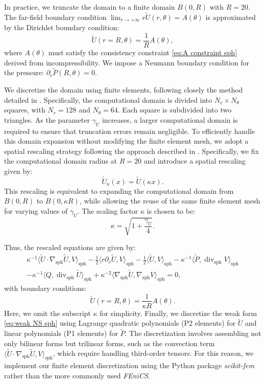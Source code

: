 \documentclass[11pt,a4paper]{article}
\numberwithin{equation}{section}
\newcommand{\cdummy}{\cdot}
\newcommand{\nospace}{}
\newcommand{\tmem}[1]{{\em #1\/}}
\newcommand{\tmop}[1]{\ensuremath{\operatorname{#1}}}
\begin{document}
In practice, we truncate the
domain to a finite domain $B
(0, R)$ with $R = 20$. The far-field boundary condition $\lim \nospace_{r
\to + \infty} r \widetilde{U} (r, \theta) = A (\theta)$ is approximated by
the Dirichlet boundary condition:
\[ \widetilde{U} (r = R, \theta) = \frac{1}{R} A (\theta), \]
where $A (\theta)$ must satisfy the consistency constraint \eqref{eq:A
constraint sph} derived from incompressibility. We impose a Neumann boundary condition for the pressure: $\partial_r\widetilde{P} (R, \theta) = 0$.

We discretize the domain using finite elements, following closely the method
detailed in {\cite{guillod2023numerical}}. Specifically, the computational
domain is divided into $N_r \times N_{\theta}$ squares, with $N_r = 128$ and
$N_{\theta} = 64$. Each square is subdivided into two triangles. As the
parameter $\gamma_U$ increases, a larger computational domain is required to
ensure that truncation errors remain negligible. To efficiently handle this
domain expansion without modifying the finite element mesh, we adopt a spatial
rescaling strategy following the approach described in
{\cite{guillod2023numerical}}. Specifically, we fix the computational domain
radius at $R = 20$ and introduce a spatial rescaling given by:
\[ \widetilde{U}_{\kappa} (x) = \widetilde{U} (\kappa x). \]
This rescaling is equivalent to expanding the computational domain from $B (0,
R)$ to $B (0, \kappa R)$, while allowing the reuse of the same finite element mesh
for varying values of $\gamma_U$. The scaling factor $\kappa$ is chosen to be:
\[ \kappa = \sqrt{1 + \frac{\gamma_U}{4}} . \]


Thus, the rescaled equations are given by:
\begin{equation}
  \begin{array}{l}
    \kappa^{-1} \langle \widetilde{U} \cdummy \nabla_{\tmop{sph}} \widetilde{U}, V
    \rangle_{\tmop{sph}} - \frac{1}{2} \langle r \partial_r \widetilde{U}, V
    \rangle_{\tmop{sph}} - \frac{1}{2} \langle \widetilde{U}, V
    \rangle_{\tmop{sph}} - \kappa^{-1} \langle \widetilde{P}, \tmop{div}_{\tmop{sph}} V
    \rangle_{\tmop{sph}}\\
    - \kappa^{-1} \langle Q, \tmop{div}_{\tmop{sph}}  \widetilde{U}
    \rangle_{\tmop{sph}} + \kappa^{-2} \langle \nabla_{\tmop{sph}} \widetilde{U},
    \nabla_{\tmop{sph}} V \rangle_{\tmop{sph}} = 0,
  \end{array} \label{eq:weak NS sph}
\end{equation}
with boundary conditions:
\[ \widetilde{U} (r = R, \theta) = \frac{1}{\kappa R} A (\theta) . \]
Here, we omit the subscript $\kappa$ for simplicity.
 Finally, we discretize
the weak form \eqref{eq:weak NS sph} using Lagrange quadratic polynomials (P2
elements) for $\widetilde{U}$ and linear polynomials (P1 elements) for
$\widetilde{P}$. The discretization involves assembling not only bilinear forms
but trilinear forms, such as the convection term $\langle \widetilde{U} \cdot
\nabla_{\text{sph}} \widetilde{U}, V \rangle_{\text{sph}}$, which require handling
third-order tensors. For this reason, we implement our finite element
discretization using the Python package {\tmem{scikit-fem}} rather than the
more commonly used {\tmem{FEniCS}}.
\end{document}
